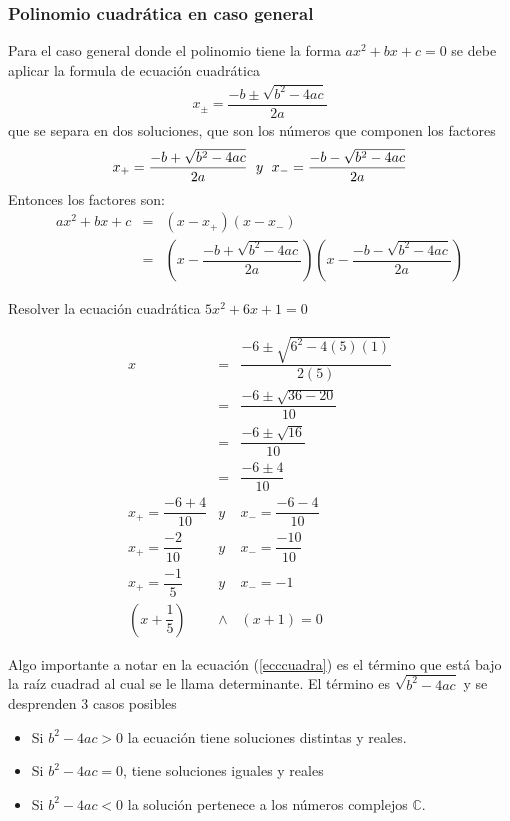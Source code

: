 \subsubsection{Polinomio cuadrática en caso general}
Para el caso  general donde el polinomio tiene la forma $ax^{2}+bx+c=0$ se debe aplicar la formula de ecuación cuadrática
\begin{eqnarray}
x_{\pm}=\dfrac{-b\pm\sqrt{b^{2}-4ac}}{2a}
\label{ecccuadra}
\end{eqnarray}
que se separa en dos soluciones, que son los números que componen los factores 
\begin{eqnarray}
x_{+}=\dfrac{-b+\sqrt{b^{2}-4ac}}{2a} \hspace{6px}y\hspace{6px}x_{-}=\dfrac{-b-\sqrt{b^{2}-4ac}}{2a}
\end{eqnarray}
Entonces los factores son:
\begin{eqnarray}
ax^{2}+bx+c&=&( x-x_{+})(x-x_{-})\\
&=&\left( x-\dfrac{-b+\sqrt{b^{2}-4ac}}{2a} \right) \left( x-\dfrac{-b-\sqrt{b^{2}-4ac}}{2a}\right)
\end{eqnarray}

\begin{myexample}
Resolver la ecuación cuadrática $5x^{2}+6x+1=0$
\end{myexample}
\begin{eqnarray*}
x&=&\dfrac{-6\pm\sqrt{6^{2}-4(5)(1)}}{2(5)}\\
&=&\dfrac{-6\pm\sqrt{36-20}}{10}\\
&=&\dfrac{-6\pm\sqrt{16}}{10}\\
&=&\dfrac{-6\pm 4}{10}\\
x_{+}=\dfrac{-6+ 4}{10} &y& x_{-}=\dfrac{-6- 4}{10}\\
x_{+}=\dfrac{-2}{10} &y& x_{-}=\dfrac{-10}{10}\\
x_{+}=\dfrac{-1}{5} &y& x_{-}=-1\\
\left(x+\dfrac{1}{5}\right)&\wedge &\left( x+1\right)=0
\end{eqnarray*}

Algo importante a notar en la ecuación (\ref{ecccuadra}) es el término que está bajo la raíz cuadrad al cual se le llama determinante. El término es $\sqrt{b^{2}-4ac}$ y se desprenden 3 casos posibles

\begin{itemize}
	\item Si $b^{2}-4ac>0$ la ecuación tiene soluciones distintas y reales.\\
	\item  Si $b^{2}-4ac=0$, tiene soluciones iguales y reales\\
	\item Si $b^{2}-4ac<0$ la solución pertenece a los números complejos $\mathbb{C}$.\\
\end{itemize}


